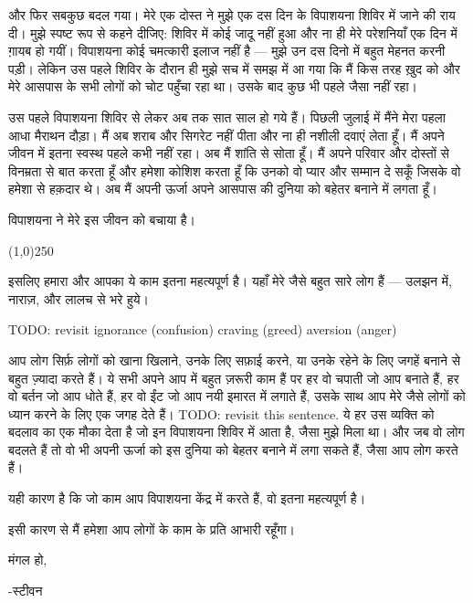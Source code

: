 \documentclass{article}
\begin{document}
और फिर सबकुछ बदल गया। मेरे एक दोस्त ने मुझे एक दस दिन के विपाशयना शिविर में जाने की राय दी। मुझे स्पष्ट
रूप से कहने दीजिए: शिविर में कोई जादू नहीं हुआ और ना ही मेरे परेशनियाँ एक दिन में ग़ायब हो गयीं।
विपाशयना कोई चमत्कारी इलाज नहीं है --- मुझे उन दस दिनो में बहुत मेहनत करनी पड़ी। लेकिन उस पहले
शिविर के दौरान ही मुझे सच में समझ में आ गया कि मैं किस तरह ख़ुद को और मेरे आसपास के सभी लोगों को चोट
पहुँचा रहा था। उसके बाद कुछ भी पहले जैसा नहीं रहा।

उस पहले विपाशयना शिविर से लेकर अब तक सात साल हो गये हैं। पिछली जुलाई में मैंने मेरा पहला आधा मैराथन
दौड़ा। मैं अब शराब और सिगरेट नहीं पीता और ना ही नशीली दवाएं लेता हूँ। मैं अपने जीवन में इतना स्वस्थ पहले
कभी नहीं रहा। अब मैं शांति से सोता हूँ। मैं अपने परिवार और दोस्तों से विनम्रता से बात करता हूँ और हमेशा
कोशिश करता हूँ कि उनको वो प्यार और सम्मान दे सकूँ जिसके वो हमेशा से हक़दार थे। अब मैं अपनी ऊर्जा अपने
आसपास की दुनिया को बहेतर बनाने में लगता हूँ।

विपाशयना ने मेरे इस जीवन को बचाया है।

\begin{center}
\line(1,0){250}
\end{center}

इसलिए हमारा और आपका ये काम इतना महत्यपूर्ण है। यहाँ मेरे जैसे बहुत सारे लोग हैं --- उलझन में, नाराज़, और लालच से भरे हुये।

TODO: revisit
ignorance (confusion)
craving (greed)
aversion (anger)

आप लोग सिर्फ़ लोगों को खाना खिलाने, उनके लिए सफ़ाई करने, या उनके रहेने के लिए जगहें बनाने से बहुत
ज़्यादा करते हैं। ये सभी अपने आप में बहुत ज़रूरी काम हैं पर हर वो चपाती जो आप बनाते हैं, हर वो बर्तन जो आप धोते हैं, हर वो ईंट जो आप नयी इमारत में लगाते हैं, उसके साथ आप मेरे जैसे लोगों को ध्यान करने के लिए एक जगह देते हैं। TODO: revisit this sentence. 
ये हर उस व्यक्ति को बदलाव का एक मौका देता है जो इन विपाशयना शिविर में
आता है, जैसा मुझे मिला था। और जब वो लोग बदलते हैं तो वो भी अपनी ऊर्जा को इस दुनिया को बेहतर
बनाने में लगा सकते हैं, जैसा आप लोग करते हैं।

यही कारण है कि जो काम आप विपाशयना केंद्र में करते हैं, वो इतना महत्यपूर्ण है।

इसी कारण से मैं हमेशा आप लोगों के काम के प्रति आभारी रहूँगा।

मंगल हो,

-स्टीवन
\end{document}
